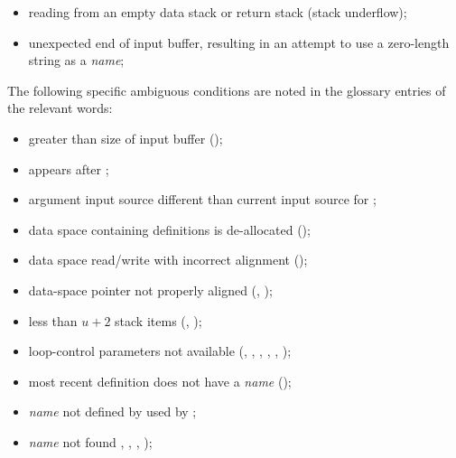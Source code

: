 \begin{itemize}
\item reading from an empty data stack or return stack
	(stack underflow);

\item unexpected end of input buffer, resulting in an attempt to
	use a zero-length string as a \emph{name};

\end{itemize}


The following specific ambiguous conditions are noted in the
glossary entries of the relevant words:

\begin{itemize}

\item {} greater than size of input buffer
	();

\item {} appears after
	;

\item argument input source different than current input source for
	;

\item data space containing definitions is de-allocated
	();

\item data space read/write with incorrect alignment
	();

\item data-space pointer not properly aligned
	(, );

\item less than $u+2$ stack items (,
	);

\item loop-control parameters not available
	(,
	 ,
	 ,
	 ,
	 ,
	 );

\item most recent definition does not have a \emph{name}
	();

\item \emph{name} not defined by  used by
	;

\item \emph{name} not found ,
	, ,
	);


\end{itemize}
